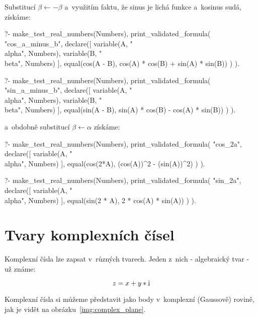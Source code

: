 Substitucí \(\beta \leftarrow -\beta\) a~využitím faktu, že sinus je lichá funkce a~kosinus sudá, získáme:

\begin{prolog}
?-	make_test_real_numbers(Numbers),
	print_validated_formula(
		"cos_a_minus_b",
		declare([
			variable(A, "\\alpha", Numbers),
			variable(B, "\\beta", Numbers)
		],
			equal(cos(A - B), cos(A) * cos(B) + sin(A) * sin(B))
		)
	).
\end{prolog}
\begin{prolog}
?-	make_test_real_numbers(Numbers),
	print_validated_formula(
		"sin_a_minus_b",
		declare([
			variable(A, "\\alpha", Numbers),
			variable(B, "\\beta", Numbers)
		],
			equal(sin(A - B), sin(A) * cos(B) - cos(A) * sin(B))
		)
	).
\end{prolog}

a~obdobně substitucí \(\beta \leftarrow \alpha\) získáme:

\begin{prolog}
?-	make_test_real_numbers(Numbers),
	print_validated_formula(
		"cos_2a",
		declare([
			variable(A, "\\alpha", Numbers)
		],
			equal(cos(2*A), (cos(A))^2 - (sin(A))^2)
		)
	).
\end{prolog}
\begin{prolog}
?-	make_test_real_numbers(Numbers),
	print_validated_formula(
		"sin_2a",
		declare([
			variable(A, "\\alpha", Numbers)
		],
			equal(sin(2 * A), 2 * cos(A) * sin(A))
		)
	).
\end{prolog}

\section{Tvary komplexních čísel}

Komplexní čísla lze zapsat v~různých tvarech. Jeden z~nich - algebraický tvar - už známe:

\begin{equation}
z = x + y * \mathrm{i}
\end{equation}

Komplexní čísla si můžeme představit jako body v~komplexní (Gaussově) rovině, jak je vidět na obrázku~\ref{img:complex_plane}.

